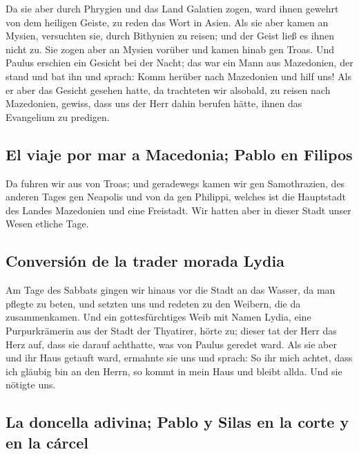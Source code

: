  Da sie aber durch Phrygien und das Land Galatien zogen,
ward ihnen gewehrt von dem heiligen Geiste, zu reden das Wort in Asien.
 Als sie aber kamen an Mysien, versuchten sie, durch
Bithynien zu reisen; und der Geist ließ es ihnen nicht zu.
 Sie zogen aber an Mysien vorüber und kamen hinab gen
Troas.  Und Paulus erschien ein Gesicht bei der Nacht; das
war ein Mann aus Mazedonien, der stand und bat ihn und sprach: Komm
herüber nach Mazedonien und hilf uns!  Als er aber das
Gesicht gesehen hatte, da trachteten wir alsobald, zu reisen nach
Mazedonien, gewiss, dass uns der Herr dahin berufen hätte, ihnen das
Evangelium zu predigen.

\hypertarget{el-viaje-por-mar-a-macedonia-pablo-en-filipos}{%
\subsection{El viaje por mar a Macedonia; Pablo en
Filipos}\label{el-viaje-por-mar-a-macedonia-pablo-en-filipos}}

 Da fuhren wir aus von Troas; und geradewegs kamen wir
gen Samothrazien, des anderen Tages gen Neapolis  und von
da gen Philippi, welches ist die Hauptstadt des Landes Mazedonien und
eine Freistadt. Wir hatten aber in dieser Stadt unser Wesen etliche
Tage.

\hypertarget{conversiuxf3n-de-la-trader-morada-lydia}{%
\subsection{Conversión de la trader morada
Lydia}\label{conversiuxf3n-de-la-trader-morada-lydia}}

 Am Tage des Sabbats gingen wir hinaus vor die Stadt an
das Wasser, da man pflegte zu beten, und setzten uns und redeten zu den
Weibern, die da zusammenkamen.  Und ein gottesfürchtiges
Weib mit Namen Lydia, eine Purpurkrämerin aus der Stadt der Thyatirer,
hörte zu; dieser tat der Herr das Herz auf, dass sie darauf achthatte,
was von Paulus geredet ward.  Als sie aber und ihr Haus
getauft ward, ermahnte sie uns und sprach: So ihr mich achtet, dass ich
gläubig bin an den Herrn, so kommt in mein Haus und bleibt allda. Und
sie nötigte uns.

\hypertarget{la-doncella-adivina-pablo-y-silas-en-la-corte-y-en-la-cuxe1rcel}{%
\subsection{La doncella adivina; Pablo y Silas en la corte y en la
cárcel}\label{la-doncella-adivina-pablo-y-silas-en-la-corte-y-en-la-cuxe1rcel}}


